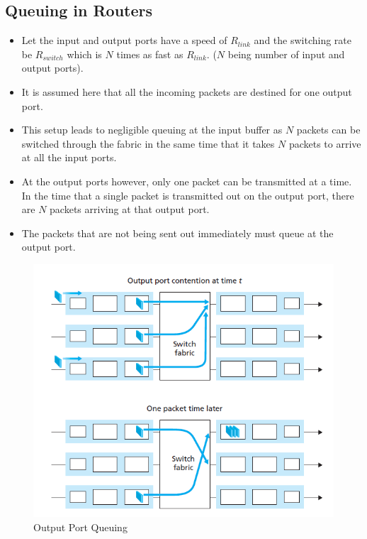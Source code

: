 \documentclass[a4paper]{article}
\theoremstyle{plain}
\theoremstyle{definition}
\begin{document}
\subsection{Queuing in Routers}
\begin{itemize}
    \item Let the input and output ports have a speed of $R_{link}$ and the switching rate be $R_{switch}$ which is $N$ times as fast as $R_{link}$. ($N$ being number of input and output ports). 
    
    \item It is assumed here that all the incoming packets are destined for one output port. 
    
    \item This setup leads to negligible queuing at the input buffer as $N$ packets can be switched through the fabric in the same time that it takes $N$ packets to arrive at all the input ports.
    
    \item At the output ports however, only one packet can be transmitted at a time. In the time that a single packet is transmitted out on the output port, there are $N$ packets arriving at that output port. 
    
    \item The packets that are not being sent out immediately must queue at the output port. 
\end{itemize}
\begin{figure}[!h]
    \centering
    \includegraphics[scale=0.7]{cn3.png}
    \caption{Output Port Queuing}
    \label{fig:my_label_3}
\end{figure}
\end{document}
